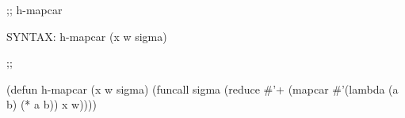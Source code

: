 \begin{aibox}{\function}
;; h-mapcar

SYNTAX: h-mapcar (x w sigma) 
\end{aibox}

\begin{aibox}{\examples}

\end{aibox}

\begin{aibox}{\comments}

\end{aibox}
\begin{aibox}{\answers}

\end{aibox}
\begin{aibox}{\othercomments}

\end{aibox}
\begin{aibox}{\pseudocode}

\end{aibox}
\begin{aibox}{\code}

;;%

(defun h-mapcar (x w sigma) 
	(funcall sigma 
		(reduce \#'+
			(mapcar \#'(lambda (a b) (* a b)) x w))))

\end{aibox}
